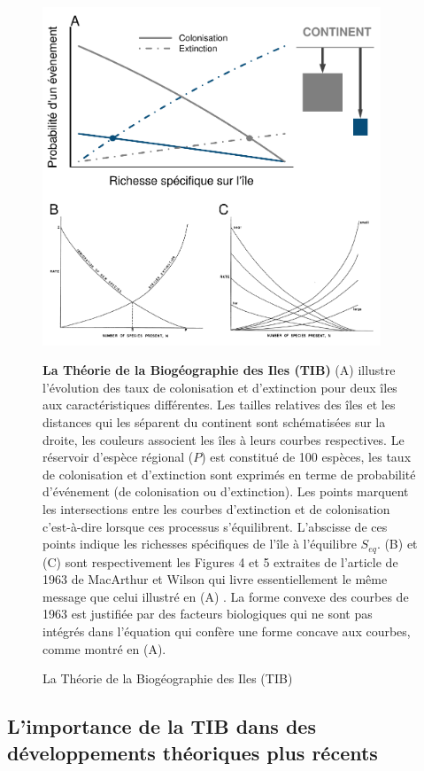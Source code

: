 \begin{figure}
\centering
\includegraphics[width=0.90000\textwidth]{fig/fig1.pdf}
\caption{La Théorie de la Biogéographie des Iles (TIB)}{\textbf{La Théorie de la Biogéographie des Iles (TIB)} (A)
illustre l'évolution des taux de colonisation et d'extinction pour deux
îles aux caractéristiques différentes. Les tailles relatives des îles et
les distances qui les séparent du continent sont schématisées sur la
droite, les couleurs associent les îles à leurs courbes respectives. Le
réservoir d'espèce régional (\(P\)) est constitué de 100 espèces, les
taux de colonisation et d'extinction sont exprimés en terme de
probabilité d'événement (de colonisation ou d'extinction). Les points
marquent les intersections entre les courbes d'extinction et de
colonisation c'est-à-dire lorsque ces processus s'équilibrent.
L'abscisse de ces points indique les richesses spécifiques de l'île à
l'équilibre \(S_{eq}\). (B) et (C) sont respectivement les Figures 4 et
5 extraites de l'article de 1963 de MacArthur et Wilson qui livre
essentiellement le même message que celui illustré en (A)
\citep{MacArthur1963}. La forme convexe des courbes de 1963 est
justifiée par des facteurs biologiques qui ne sont pas intégrés dans
l'équation \label{eqMW} qui confère une forme concave aux courbes, comme
montré en (A).\label{fig:figMW}}
\end{figure}

\subsection*{L'importance de la TIB dans des développements théoriques
plus
récents}\label{limportance-de-la-tib-dans-des-duxe9veloppements-thuxe9oriques-plus-ruxe9cents}

